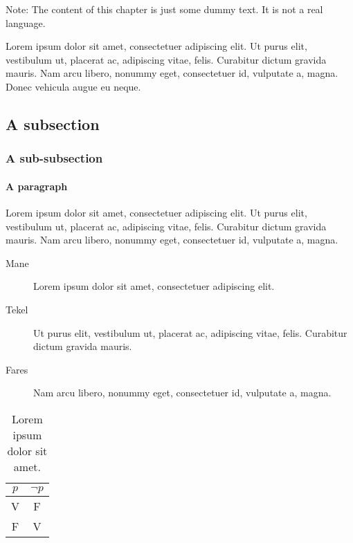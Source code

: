 Note: The content of this chapter is just some dummy text. It is not a real language.

Lorem ipsum dolor sit amet, consectetuer adipiscing elit. Ut purus elit, vestibulum ut, placerat ac, adipiscing vitae, felis. Curabitur dictum gravida mauris. Nam arcu libero, nonummy eget, consectetuer id, vulputate a, magna. Donec vehicula augue eu neque.

\subsection*{A subsection}
\lipsum[2]

\subsubsection*{A sub-subsection}
\lipsum[3]

\paragraph{A paragraph} Lorem ipsum dolor sit amet, consectetuer adipiscing elit. Ut purus elit, vestibulum ut, placerat ac, adipiscing vitae, felis. Curabitur dictum gravida mauris. Nam arcu libero, nonummy eget, consectetuer id, vulputate a, magna.

\bigskip

\lipsum[2]

\begin{description}
\item[Mane] Lorem ipsum dolor sit amet, consectetuer adipiscing elit. 
\item[Tekel] Ut purus elit, vestibulum ut, placerat ac, adipiscing vitae, felis. Curabitur dictum gravida mauris.
\item[Fares] Nam arcu libero, nonummy eget, consectetuer 
id, vulputate a, magna.
\end{description}

\begin{table}
\caption[Lorem ipsum dolor.]{Lorem ipsum dolor sit amet.}
\centering
\begin{tabular}{cc}
\toprule
$p$ & $\lnot p$ \\ 
\midrule
V   & F \\ 
F   & V \\
\bottomrule 
\end{tabular}
\end{table}

\lipsum[1]




